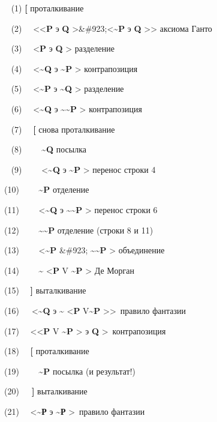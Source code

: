 \documentclass[../main.tex]{subfiles}
\begin{document}
~ (1) \textbf{{[}} проталкивание

~ (2)~~ \textless\textless{}\textbf{P} э \textbf{Q} \textgreater\&\#923;\textless{}\textbf{\textasciitilde P} э \textbf{Q} \textgreater\textgreater{} аксиома Ганто

~ (3)~~ \textless{}\textbf{P} э \textbf{Q} \textgreater{} разделение

~ (4)~~ \textless{}\textbf{\textasciitilde Q} э \textbf{\textasciitilde P} \textgreater{} контрапозиция

~ (5)~~ \textless{}\textbf{\textasciitilde P} э \textbf{\textasciitilde Q} \textgreater{} разделение

~ (6)~~ \textless{}\textbf{\textasciitilde Q} э \textbf{\textasciitilde\textasciitilde P} \textgreater{} контрапозиция

~ (7)~~ \textbf{{[}} снова проталкивание

~ (8)~~~~ \textbf{\textasciitilde Q} посылка

~ (9)~~~~ \textless{}\textbf{\textasciitilde Q} э \textbf{\textasciitilde P} \textgreater{} перенос строки 4

(10)~~~ ~\textbf{\textasciitilde P} отделение

(11)~~~~ \textless{}\textbf{\textasciitilde Q} э \textbf{\textasciitilde\textasciitilde P} \textgreater{} перенос строки 6

(12)~~~~ \textbf{\textasciitilde\textasciitilde P} отделение (строки 8 и 11)

(13)~~~~ \textless{}\textbf{\textasciitilde P} \&\#923; \textbf{\textasciitilde\textasciitilde P} \textgreater{} объединение

(14)~~~~ \textbf{\textasciitilde{}} \textless{}\textbf{P} V \textbf{\textasciitilde P} \textgreater{} Де Морган

(15)~~ \textbf{{]}} выталкивание

(16)~~~\textless{}\textbf{\textasciitilde Q} э \textbf{\textasciitilde{}} \textless{}\textbf{P} V\textbf{\textasciitilde P} \textgreater\textgreater~правило фантазии

(17)~~ \textless\textless{}\textbf{P} V \textbf{\textasciitilde P} \textgreater{} э \textbf{Q} \textgreater~контрапозиция

(18)~~ \textbf{{[}} проталкивание

(19)~~~~ \textbf{\textasciitilde P} посылка (и результат!)

(20)~~~\textbf{{]}} выталкивание

(21)~~ \textless{}\textbf{\textasciitilde Р} э \textbf{\textasciitilde Р} \textgreater~правило фантазии
\end{document}
